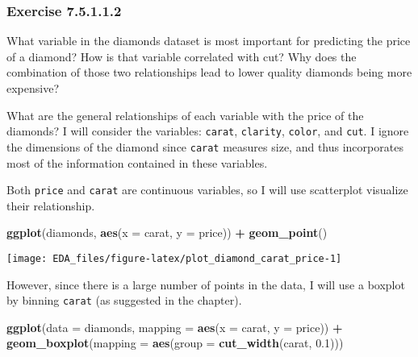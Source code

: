 \documentclass[]{book}
\newenvironment{Shaded}{\begin{snugshade}}{\end{snugshade}}
\newcommand{\DataTypeTok}[1]{\textcolor[rgb]{0.13,0.29,0.53}{#1}}
\newcommand{\FloatTok}[1]{\textcolor[rgb]{0.00,0.00,0.81}{#1}}
\newcommand{\KeywordTok}[1]{\textcolor[rgb]{0.13,0.29,0.53}{\textbf{#1}}}
\newcommand{\NormalTok}[1]{#1}
\newcommand{\OperatorTok}[1]{\textcolor[rgb]{0.81,0.36,0.00}{\textbf{#1}}}
\newcommand{\StringTok}[1]{\textcolor[rgb]{0.31,0.60,0.02}{#1}}
\theoremstyle{plain}
\theoremstyle{remark}
\begin{document}
\hypertarget{exercise-7.5.1.1.2}{%
\subsubsection*{\texorpdfstring{Exercise
{7.5.1.1.2}}{Exercise 7.5.1.1.2}}\label{exercise-7.5.1.1.2}}

What variable in the diamonds dataset is most important for predicting
the price of a diamond? How is that variable correlated with cut? Why
does the combination of those two relationships lead to lower quality
diamonds being more expensive?

What are the general relationships of each variable with the price of
the diamonds? I will consider the variables: \texttt{carat},
\texttt{clarity}, \texttt{color}, and \texttt{cut}. I ignore the
dimensions of the diamond since \texttt{carat} measures size, and thus
incorporates most of the information contained in these variables.

Both \texttt{price} and \texttt{carat} are continuous variables, so I
will use scatterplot visualize their relationship.

\begin{Shaded}
\begin{Highlighting}[]
\KeywordTok{ggplot}\NormalTok{(diamonds, }\KeywordTok{aes}\NormalTok{(}\DataTypeTok{x =}\NormalTok{ carat, }\DataTypeTok{y =}\NormalTok{ price)) }\OperatorTok{+}
\StringTok{  }\KeywordTok{geom_point}\NormalTok{()}
\end{Highlighting}
\end{Shaded}

\begin{center}\texttt{[image: EDA\_files/figure-latex/plot\_diamond\_carat\_price-1]} \end{center}

However, since there is a large number of points in the data, I will use
a boxplot by binning \texttt{carat} (as suggested in the chapter).

\begin{Shaded}
\begin{Highlighting}[]
\KeywordTok{ggplot}\NormalTok{(}\DataTypeTok{data =}\NormalTok{ diamonds, }\DataTypeTok{mapping =} \KeywordTok{aes}\NormalTok{(}\DataTypeTok{x =}\NormalTok{ carat, }\DataTypeTok{y =}\NormalTok{ price)) }\OperatorTok{+}
\StringTok{  }\KeywordTok{geom_boxplot}\NormalTok{(}\DataTypeTok{mapping =} \KeywordTok{aes}\NormalTok{(}\DataTypeTok{group =} \KeywordTok{cut_width}\NormalTok{(carat, }\FloatTok{0.1}\NormalTok{)))}
\end{Highlighting}
\end{Shaded}
\end{document}

